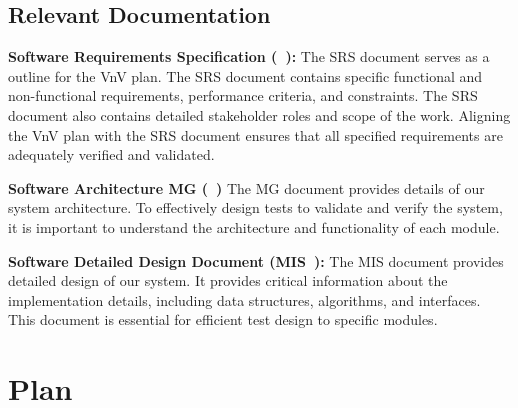 \documentclass[12pt, titlepage]{article}
\begin{document}

\subsection{Relevant Documentation}

\textbf{Software Requirements Specification (\SRS~\cite{SRS}):}
The SRS document serves as a outline for the VnV plan. The SRS document
contains specific functional and non-functional requirements, performance
criteria, and constraints. The SRS document also contains detailed stakeholder
roles and scope of the work. Aligning the VnV plan with the SRS document ensures
that all specified requirements are adequately verified and validated.

\textbf{Software Architecture MG (\MG~\cite{MG}) }
The MG document provides details of our system architecture. To effectively design
tests to validate and verify the system, it is important to understand the
architecture and functionality of each module.

\textbf{Software Detailed Design Document (MIS~\cite{MIS}):}
The MIS document provides detailed design of our system. It provides critical information
about the implementation details, including data structures, algorithms, and interfaces.
This document is essential for efficient test design to specific modules.



\section{Plan}
\end{document}
